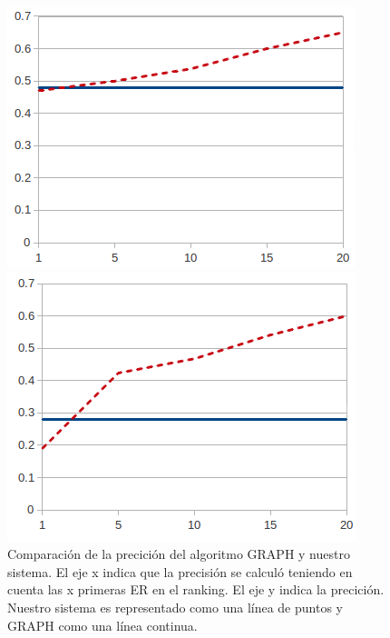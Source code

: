 \begin{figure}[H]
\begin{minipage}{0.50\linewidth}
\centering
\includegraphics[width=\textwidth]{images/furniturePrec.png}
\end{minipage}
\begin{minipage}{0.50\linewidth}
\centering
\includegraphics[width=\textwidth]{images/precP.png}
\end{minipage}
\caption{Comparaci\'on de la precici\'on del algoritmo GRAPH y nuestro sistema. El eje x indica que la precisi\'on se calcul\'o teniendo en cuenta las x primeras ER en el ranking. El eje y indica la precici\'on. Nuestro sistema es representado como una l\'inea de puntos y GRAPH como una l\'inea continua.\label{graficoPresicion}}
\end{figure}

